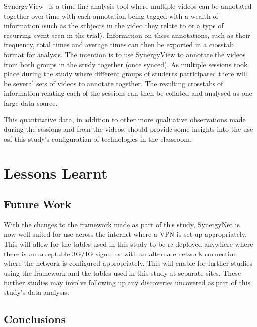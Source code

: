 \documentclass[a4paper,11pt]{article}
\begin{document}
SynergyView~\cite{kyaw:2010} is a time-line analysis tool where multiple videos can be annotated together over time with each annotation being tagged with a wealth of information (such as the subjects in the video they relate to or a type of recurring event seen in the trial).
Information on these annotations, such as their frequency, total times and average times can then be exported in a crosstab format for analysis.
The intention is to use SynergyView to annotate the videos from both groups in the study together (once synced).
As multiple sessions took place during the study where different groups of students participated there will be several sets of videos to annotate together.
The resulting crosstabs of information relating each of the sessions can then be collated and analysed as one large data-source.

This quantitative data, in addition to other more qualitative observations made during the sessions and from the videos, should provide some insights into the use osf this study’s configuration of technologies in the classroom.


\section{Lessons Learnt}


\subsection{Future Work}

With the changes to the framework made as part of this study, SynergyNet is now well suited for use across the internet where a VPN is set up appropriately.
This will allow for the tables used in this study to be re-deployed anywhere where there is an acceptable 3G/4G signal or with an alternate network connection where the network is configured appropriately.
This will enable for further studies using the framework and the tables used in this study at separate sites.
These further studies may involve following up any discoveries uncovered as part of this study’s data-analysis.

\subsection{Conclusions}




\end{document}
